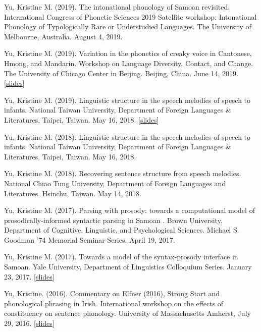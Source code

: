 \documentclass[10pt]{article}
\begin{document}
\begin{bibenum}
\item Yu, Kristine M. (2019). The intonational phonology of Samoan revisited. International Congress of Phonetic Sciences 2019 Satellite workshop: Intonational Phonology of Typologically Rare or Understudied Languages. The University of Melbourne, Australia. August 4, 2019.

\item Yu, Kristine M. (2019). Variation in the phonetics of creaky voice in Cantonese, Hmong, and Mandarin. Workshop on Language Diversity, Contact, and Change. The University of Chicago Center in Beijing. Beijing, China. June 14, 2019. [\href{https://speakerdeck.com/krisyu/uchicago-beijing-creak-kmyu-201906}{slides}]


\item Yu, Kristine M. (2019). Linguistic structure in the speech melodies of speech to infants. National Taiwan University, Department of Foreign Languages \& Literatures. Taipei, Taiwan. May 16, 2018. [\href{https://speakerdeck.com/krisyu/towards-a-model-of-the-samoan-syntax-prosody-interface}{slides}]


\item Yu, Kristine M. (2018). Linguistic structure in the speech melodies of speech to infants. National Taiwan University, Department of Foreign Languages \& Literatures. Taipei, Taiwan. May 16, 2018.

\item Yu, Kristine M. (2018). Recovering sentence structure from speech melodies. National Chiao Tung University, Department of Foreign Languages and Literatures. Hsinchu, Taiwan. May 14, 2018.

\item Yu, Kristine M. (2017). Parsing with prosody: towards a computational model of prosodically-informed syntactic parsing in Samoan
. Brown University, Department of
  Cognitive, Linguistic, and Psychological Sciences. Michael S. Goodman '74 Memorial Seminar Series. April 19, 2017.
\item Yu, Kristine M. (2017). Towards a model of the syntax-prosody interface in Samoan. Yale University, Department of
  Linguistics Colloquium Series. January 23, 2017. [\href{https://speakerdeck.com/krisyu/towards-a-model-of-the-samoan-syntax-prosody-interface}{slides}]
  \item Yu, Kristine. (2016). Commentary on Elfner (2016), Strong
    Start and phonological phrasing in Irish. International workshop on the effects of
    constituency on sentence phonology. University of Massachusetts
    Amherst, July 29, 2016. [\href{https://speakerdeck.com/krisyu/commentary-on-elfners-strong-start-and-phonological-phrasing-in-irish}{slides}]


\end{bibenum}
\end{document}
